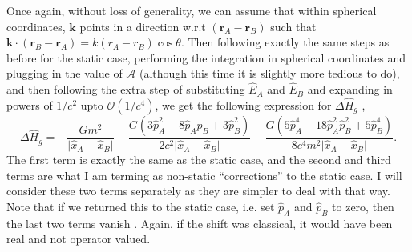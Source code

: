 \documentclass[12pt,a4paper]{report}
\theoremstyle{plain}
\theoremstyle{definition}
\theoremstyle{remark}
\newcommand{\BigO}{\mathcal{O}}
\begin{document}
Once again, without loss of generality, we can assume that within spherical coordinates, $\bm{k}$ points in a direction w.r.t $(\bm{r}_A - \bm{r}_B)$ such that $\bm{k}\cdot(\bm{r}_B - \bm{r}_A) = k(r_A - r_B)\cos\theta$. Then following exactly the same steps as before for the static case, performing the integration in spherical coordinates and plugging in the value of $\mathcal{A}$ (although this time it is slightly more tedious to do), and then following the extra step of substituting $\hat{E}_{A}$ and $\hat{E}_{B}$ and expanding in powers of $1/c^2$ upto $\BigO(1/c^4)$, we get the following expression for $\Delta\hat{H}_{g}$ \cite{Bose_2022},
\begin{equation}
    \Delta\hat{H}_{g} =-\frac{Gm^{2}}{\vert{\hat{x}}_{A}-{\hat{x}}_{B}\vert} -\frac{G(3{\hat{p}}_{A}^{2}-8\hat{p}_{A}\hat{p}_{B}+3{\hat{p}}_{B}^{2})}{2c^{2}\vert{\hat{x}}_{A}-{\hat{x}}_{B}\vert} -\frac{G(5{\hat{p}}_{A}^{4}-18{\hat{p}}_{A}^{2}{\hat{p}}_{B}^{2}+5{\hat{p}}_{B}^{4})}{8c^{4}m^{2}\vert{\hat{x}}_{A}-{\hat{x}}_{B}\vert}.
\end{equation}
The first term is exactly the same as the static case, and the second and third terms are what I am terming as non-static ``corrections'' to the static case. I will consider these two terms separately as they are simpler to deal with that way. Note that if we returned this to the static case, i.e. set $\hat{p}_{A}$ and \(\hat{p}_{B}\) to zero, then the last two terms vanish \cite{Bose_2022}. Again, if the shift was classical, it would have been real and not operator valued.
\end{document}
